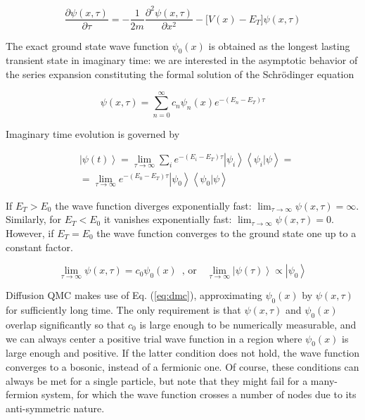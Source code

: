 \begin{equation}
\frac{\partial \psi ( x, \tau )}{\partial\tau}  = -\frac{1}{2m}\frac{\partial^2 \psi ( x, \tau )}{\partial x^2} - \bigg[ V(x) - E_T \bigg] \psi( x, \tau ) 
\end{equation}

The exact ground state wave function $\psi_0 ( x )$ is obtained as the longest lasting transient state in imaginary time: we are interested in the asymptotic behavior of the series expansion constituting the formal solution of the Schr\"odinger equation

\begin{equation}
\psi (x, \tau) = \sum_{n=0}^{\infty} c_n \psi_n (x) e^{-(E_n - E_T)\tau}
\end{equation}

Imaginary time evolution is governed by

\begin{equation}\label{eq:im_ev}
\begin{split}
&\left| \psi (t) \right\rangle = \lim_{\tau \rightarrow \infty} \sum_i e^{-(E_i - E_T) \tau} \left|\psi_i \right\rangle \left\langle \psi_i | \psi \right\rangle = \\
&= \lim_{\tau \rightarrow \infty} e^{-(E_0 - E_T)\tau} \left| \psi_0 \right\rangle \left\langle \psi_0 | \psi \right\rangle 
\end{split}
\end{equation}


If $E_T > E_0$ the wave function diverges exponentially fast: $\lim_{\tau \rightarrow \infty} \psi ( x, \tau) = \infty$.
Similarly, for $E_T < E_0$ it vanishes exponentially fast: $\lim_{\tau \rightarrow \infty} \psi ( x, \tau) = 0$.
However, if $E_T = E_0$ the wave function converges to the ground state one up to a constant factor.

\begin{equation}\label{eq:dmc}
\lim_{\tau \rightarrow \infty} \psi ( x, \tau) = c_0 \psi_0 (x) \,\,\, \text{, or} \quad \lim_{\tau \rightarrow \infty} \left|\psi (\tau) \right\rangle \propto \left| \psi_0 \right\rangle
\end{equation}

Diffusion \ac{QMC} makes use of Eq. (\ref{eq:dmc}), approximating $\psi_0(x)$ by $\psi (x, \tau)$ for sufficiently long time.
The only requirement is that $\psi (x, \tau)$ and $\psi_0(x)$ overlap significantly so that $c_0$ is large enough to be numerically measurable, and we can always center a positive trial wave function in a region where $\psi_0(x)$ is large enough and positive.
If the latter condition does not hold, the wave function converges to a bosonic, instead of a fermionic one.
Of course, these conditions can always be met for a single particle, but note that they might fail for a many-fermion system, for which the wave function crosses a number of nodes due to its anti-symmetric nature.

